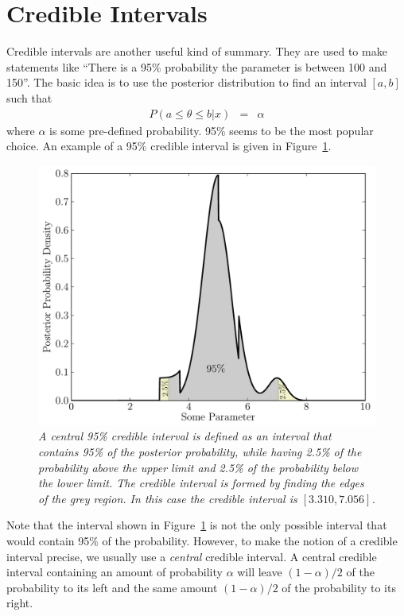 \section{Credible Intervals}
Credible intervals are another useful kind of summary. They are used to make
statements like ``There is a 95\% probability the parameter is between
100 and 150''. The basic idea is to
use the posterior distribution to find an interval $[a, b]$ such that
\begin{eqnarray}
P(a \leq \theta \leq b | x) &=& \alpha
\end{eqnarray}
where $\alpha$ is some pre-defined probability. 95\% seems to be the
most popular choice. An example of a 95\% credible interval is given in
Figure~\ref{fig:credible_interval}.

\begin{figure}[ht!]
\begin{center}
\includegraphics[scale=0.5]{Figures/credible_interval.pdf}
\caption{\it A central 95\% credible interval is defined as an interval that
contains 95\% of the posterior probability, while having 2.5\% of the probability
above the upper limit and 2.5\% of the probability below the lower limit. The
credible interval is formed by finding the edges of the grey region. In this
case the credible interval is $[3.310, 7.056]$.
\label{fig:credible_interval}}
\end{center}
\end{figure}
Note that the interval shown in Figure~\ref{fig:credible_interval} is not the
only possible interval that would contain 95\% of the probability. However, to
make the notion of a credible interval precise, we usually use a {\it central}
credible interval. A central credible interval containing an amount of probability
$\alpha$ will leave $(1-\alpha)/2$ of the probability to its left and
the same amount $(1-\alpha)/2$ of the probability to its right.

